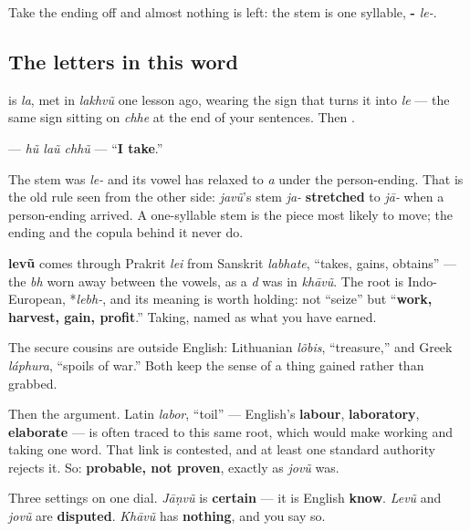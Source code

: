 Take the ending off and almost nothing is left: the stem is one syllable, \textbf{-} \emph{le-}.

\subsection*{The letters in this word}
\textbf{} is \textbf{} \emph{la}, met in \emph{lakhvũ} one lesson ago, wearing the sign \textbf{} that turns it into \emph{le} — the same sign sitting on \textbf{} \emph{chhe} at the end of your sentences. Then \textbf{}.

\begin{grammarlens}[title={Grammar Lens: the stem relaxes when a person arrives}]
\textbf{  } — \emph{hũ laũ chhũ} — \textquotedblleft{}\textbf{I take}.\textquotedblright{}

The stem was \emph{le-} and its vowel has relaxed to \emph{a} under the person-ending. That is the old rule seen from the other side: \emph{javũ}'s stem \emph{ja-} \textbf{stretched} to \emph{jā-} when a person-ending arrived. A one-syllable stem is the piece most likely to move; the ending and the copula behind it never do.
\end{grammarlens}

\begin{cousinweb}
\textbf{levũ} comes through Prakrit \emph{lei} from Sanskrit \emph{labhate}, \textquotedblleft{}takes, gains, obtains\textquotedblright{} — the \emph{bh} worn away between the vowels, as a \emph{d} was in \emph{khāvũ}. The root is Indo-European, *\emph{lebh-}, and its meaning is worth holding: not \textquotedblleft{}seize\textquotedblright{} but \textquotedblleft{}\textbf{work, harvest, gain, profit}.\textquotedblright{} Taking, named as what you have earned.

The secure cousins are outside English: Lithuanian \emph{lõbis}, \textquotedblleft{}treasure,\textquotedblright{} and Greek \emph{láphura}, \textquotedblleft{}spoils of war.\textquotedblright{} Both keep the sense of a thing gained rather than grabbed.

Then the argument. Latin \emph{labor}, \textquotedblleft{}toil\textquotedblright{} — English's \textbf{labour}, \textbf{laboratory}, \textbf{elaborate} — is often traced to this same root, which would make working and taking one word. That link is contested, and at least one standard authority rejects it. So: \textbf{probable, not proven}, exactly as \emph{jovũ} was.

Three settings on one dial. \emph{Jāṇvũ} is \textbf{certain} — it is English \textbf{know}. \emph{Levũ} and \emph{jovũ} are \textbf{disputed}. \emph{Khāvũ} has \textbf{nothing}, and you say so.
\end{cousinweb}

